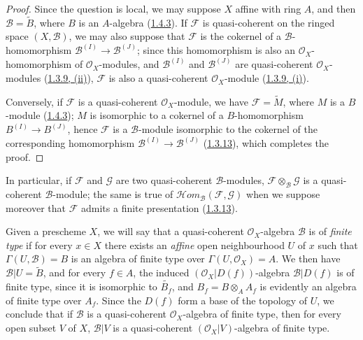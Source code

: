 \begin{proof}
Since the question is local, we may suppose $X$ affine with ring $A$, and
then $\mathscr{B}=\widetilde{B}$, where $B$ is an $A$-algebra
(\hyperref[I.1.4.3]{1.4.3}). If $\mathscr{F}$ is quasi-coherent on
the ringed space $(X,\mathscr{B})$, we may also suppose that
$\mathscr{F}$ is the cokernel of a $\mathscr{B}$-homomorphism
$\mathscr{B}^{(I)}\to\mathscr{B}^{(J)}$; since this homomorphism is
also an $\mathscr{O}_X$-homomorphism of $\mathscr{O}_X$-modules, and
$\mathscr{B}^{(I)}$ and $\mathscr{B}^{(J)}$ are quasi-coherent
$\mathscr{O}_X$-modules
(\hyperref[I.1.3.9]{1.3.9, (ii)}), $\mathscr{F}$ is also a
quasi-coherent $\mathscr{O}_X$-module
(\hyperref[I.1.3.9]{1.3.9, (i)}).

Conversely, if $\mathscr{F}$ is a quasi-coherent $\mathscr{O}_X$-module,
we have $\mathscr{F}=\widetilde{M}$, where $M$ is a $B$-module
(\hyperref[I.1.4.3]{1.4.3}); $M$ is isomorphic to a cokernel of a
$B$-homomorphism $B^{(I)}\to B^{(J)}$, hence $\mathscr{F}$ is a
$\mathscr{B}$-module isomorphic to the cokernel of the corresponding
homomorphism $\mathscr{B}^{(I)}\to\mathscr{B}^{(J)}$
(\hyperref[I.1.3.13]{1.3.13}), which completes the proof.
\end{proof}

In particular, if $\mathscr{F}$ and $\mathscr{G}$ are two quasi-coherent
$\mathscr{B}$-modules,
$\mathscr{F}\otimes_{\mathscr{B}}\mathscr{G}$ is a quasi-coherent
$\mathscr{B}$-module; the same is true of
$\mathscr{H}\!om_{\mathscr{B}}(\mathscr{F},\mathscr{G})$ when we suppose
moreover that $\mathscr{F}$ admits a finite presentation
(\hyperref[I.1.3.13]{1.3.13}).

\begin{env}[9.6.2]
\label{I.9.6.2}
Given a prescheme $X$, we will say that a quasi-coherent
$\mathscr{O}_X$-algebra $\mathscr{B}$ is of \emph{finite type} if for every
$x\in X$ there exists an \emph{affine} open neighbourhood $U$ of $x$ such
that $\Gamma(U,\mathscr{B})=B$ is an algebra of finite type over
$\Gamma(U,\mathscr{O}_X)=A$. We then have $\mathscr{B}|U=\widetilde{B}$,
and for every $f\in A$, the induced $(\mathscr{O}_X|D(f))$-algebra
$\mathscr{B}|D(f)$ is of finite type, since it is isomorphic to
$\widetilde{B_f}$, and $B_f=B\otimes_A A_f$ is evidently an algebra of
finite type over $A_f$. Since the $D(f)$ form a base of the topology of
$U$, we conclude that if $\mathscr{B}$ is a quasi-coherent
$\mathscr{O}_X$-algebra of finite type, then for every open subset $V$ of
$X$, $\mathscr{B}|V$ is a quasi-coherent $(\mathscr{O}_X|V)$-algebra of
finite type.
\end{env}

